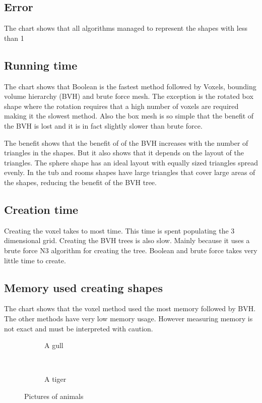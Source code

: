 \documentclass[11pt,twoside,a4paper]{report}
\begin{document}
\subsection{Error}
The chart shows that all algorithms managed to represent the shapes with less than 1 %

\subsection{Running time}
The chart shows that Boolean is the fastest method followed by Voxels, bounding volume hierarchy (BVH) and brute force mesh. The exception is the rotated box shape where the rotation requires that a high number of voxels are required making it the slowest method. Also the box mesh is so simple that the benefit of the BVH is lost and it is in fact slightly slower than brute force.

The benefit shows that the benefit of of the BVH increases with the number of triangles in the shapes. But it also shows that it depends on the layout of the triangles. The sphere shape has an ideal layout with equally sized triangles spread evenly. In the tub and rooms shapes have large triangles that cover large areas of the shapes, reducing the benefit of the BVH tree.

\subsection{Creation time}
Creating the voxel  takes to most time. This time is spent populating the 3 dimensional grid. Creating the BVH trees is also slow. Mainly because it uses a brute force N3 algorithm for creating the tree. Boolean and brute force takes very little time to create.

\subsection{Memory used creating shapes}
The chart shows that the voxel method used the most memory followed by BVH. The other methods have very low memory usage. However measuring memory is not exact and must be interpreted with caution. 

\begin{figure}[h]
        \centering
        \begin{subfigure}[h]{0.3\textwidth}
                \caption{A gull}
                \label{fig:gull}
        \end{subfigure}%
        ~ %
        \begin{subfigure}[h]{0.3\textwidth}
                \caption{A tiger}
                \label{fig:tiger}
        \end{subfigure}
        \caption{Pictures of animals}\label{fig:animals}
\end{figure}
\end{document}
